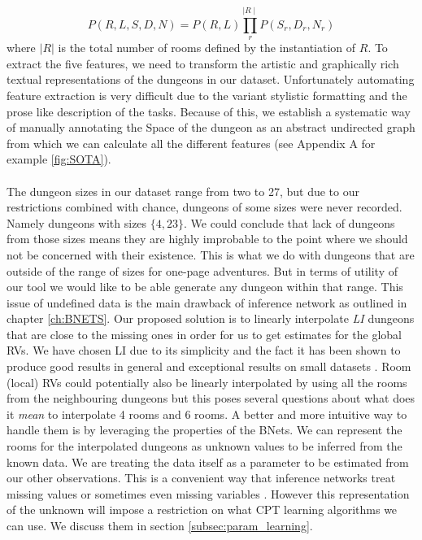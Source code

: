 \documentclass{UoYCSproject}
\begin{document}
\begin{equation}
  \label{eq:full_joint_PD}
  P(R,L,S,D,N) = P(R, L) \prod_{r}^{\mid R \mid} P(S_r, D_r, N_r)
\end{equation}
where \(|R|\) is the total number of rooms defined by the instantiation of \(R\). To extract the five features, we need to transform the artistic and graphically rich textual representations of the dungeons in our dataset. Unfortunately automating feature extraction is very difficult due to the variant stylistic formatting and the prose like description of the tasks. Because of this, we establish a systematic way of manually annotating the Space of the dungeon as an abstract undirected graph from which we can calculate all the different features (see Appendix A for example \ref{fig:SOTA}).

\paragraph{}
The dungeon sizes in our dataset range from two to 27, but due to our restrictions combined with chance, dungeons of some sizes were never recorded. Namely dungeons with sizes \(\{4,23\}\). We could conclude that lack of dungeons from those sizes means they are highly improbable to the point where we should not be concerned with their existence. This is what we do with dungeons that are outside of the range of sizes for one-page adventures. But in terms of utility of our tool we would like to be able generate any dungeon within that range. This issue of undefined data is the main drawback of inference network as outlined in chapter \ref{ch:BNETS}. Our proposed solution is to linearly interpolate \textit{LI} dungeons that are close to the missing ones in order for us to get estimates for the global RVs. We have chosen LI due to its simplicity and the fact it has been shown to produce good results in general \parencite{Ibargengoytia2013OnTE} and exceptional results on small datasets \parencite{yu2004advances}. Room (local) RVs could potentially also be linearly interpolated by using all the rooms from the neighbouring dungeons but this poses several questions about what does it \textit{mean} to interpolate 4 rooms and 6 rooms. A better and more intuitive way to handle them is by leveraging the properties of the BNets. We can represent the rooms for the interpolated dungeons as unknown values to be inferred from the known data. We are treating the data itself as a parameter to be estimated from our other observations. This is a convenient way that inference networks treat missing values or sometimes even missing variables \parencite[p45]{neticaCman}. However this representation of the unknown will impose a restriction on what CPT learning algorithms we can use. We discuss them in section \ref{subsec:param_learning}.
\end{document}

